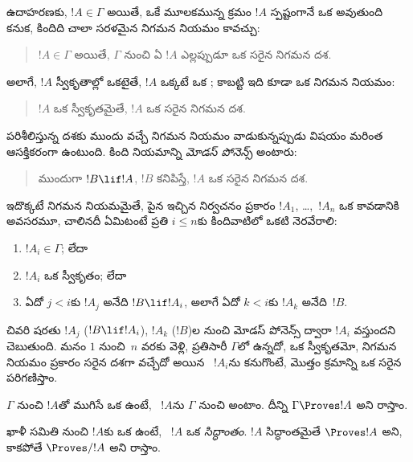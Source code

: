 \documentclass[../../../include/open-logic-section]{subfiles}
\begin{document}
ఉదాహరణకు, $!A \in \Gamma$ అయితే, ఒకే మూలకమున్న క్రమం $!A$ స్పష్టంగానే ఒక
 అవుతుంది కనుక, కిందిది చాలా సరళమైన నిగమన నియమం
కావచ్చు:
\begin{quote}
  $!A \in \Gamma$ అయితే, $\Gamma$ నుంచి ఏ 
  $!A$ ఎల్లప్పుడూ ఒక సరైన నిగమన దశ.
\end{quote}
అలాగే, $!A$ స్వీకృతాల్లో ఒకటైతే, $!A$ ఒక్కటే ఒక
; కాబట్టి ఇది కూడా ఒక నిగమన నియమం:
\begin{quote}
  $!A$ ఒక స్వీకృతమైతే, $!A$ ఒక సరైన నిగమన దశ.
\end{quote}
పరిశీలిస్తున్న దశకు ముందు వచ్చే  నిగమన నియమం
వాడుకున్నప్పుడు విషయం మరింత ఆసక్తికరంగా ఉంటుంది. కింది నియమాన్ని
\emph{మోడస్ పోనెన్స్} అంటారు:
\begin{quote}
   ముందుగా $!B \lif !A$, $!B$ కనిపిస్తే,
  $!A$ ఒక సరైన నిగమన దశ.
\end{quote}
ఇదొక్కటే నిగమన నియమమైతే, పైన ఇచ్చిన  నిర్వచనం
ప్రకారం $!A_1$, \dots,~$!A_n$ ఒక  కావడానికి అవసరమూ,
చాలినదీ ఏమిటంటే ప్రతి $i \le n$కు కిందివాటిలో ఒకటి నెరవేరాలి:
\begin{enumerate}
\item $!A_i \in \Gamma$; లేదా
\item $!A_i$ ఒక స్వీకృతం; లేదా
\item ఏదో $j < i$కు $!A_j$ అనేది $!B \lif !A_i$, అలాగే ఏదో $k < i$కు
  $!A_k$ అనేది~$!B$.
\end{enumerate}
చివరి షరతు $!A_j$ ($!B \lif !A_i$), $!A_k$ ($!B$)ల నుంచి
మోడస్ పోనెన్స్ ద్వారా $!A_i$ వస్తుందని చెబుతుంది. మనం $1$ నుంచి~$n$
వరకు వెళ్లి, ప్రతిసారీ $\Gamma$లో ఉన్నదో, ఒక స్వీకృతమో, నిగమన నియమం ప్రకారం
సరైన దశగా వచ్చేదో అయిన ~$!A_i$ను కనుగొంటే, మొత్తం క్రమాన్ని ఒక సరైన
 పరిగణిస్తాం.

\begin{defn}
$\Gamma$ నుంచి $!A$తో ముగిసే ఒక  ఉంటే,
~$!A$ను $\Gamma$ నుంచి \emph{} అంటాం.
దీన్ని $\Gamma \Proves !A$ అని రాస్తాం.
\end{defn}

\begin{defn}[సిద్ధాంతాలు]
ఖాళీ సమితి నుంచి $!A$కు ఒక  ఉంటే, ~$!A$
ఒక \emph{సిద్ధాంతం}. $!A$ సిద్ధాంతమైతే $\Proves !A$ అని,
కాకపోతే $\Proves/ !A$ అని రాస్తాం.
\end{defn}
\end{document}
